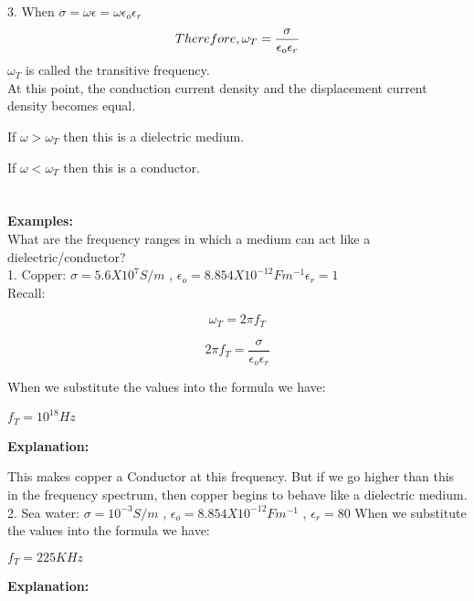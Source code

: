 	3. When $\sigma = \omega\epsilon = \omega\epsilon_{o}\epsilon_{r}$\\
	
	\begin{equation} Therefore,  \omega_{T} = \dfrac{\sigma}{\epsilon_{o}\epsilon_{r}}\\
	\end{equation}
	$\omega_{T}$ is called the transitive frequency.\\
	
	At this point, the conduction current density and the displacement current density becomes equal.
	
	If $\omega > \omega_{T}$ then this is a dielectric medium.
	
	If $\omega < \omega_{T}$ then this is a conductor.\\\\\\
	
	
	\textbf{Examples:}\\
	What are the frequency ranges in which a medium can act like a dielectric/conductor?\\
	
	1. Copper: $\sigma = 5.6 X 10^{7}S/m$ , $\epsilon_{o} = 8.854 X 10^{-12}Fm^{-1} \epsilon_{r} = 1$\\
	
	Recall:
	
	\begin{equation}
	\omega_{T} = 2\pi f_{T}
	\end{equation}
	
	\begin{equation}
	2\pi f_{T} = \dfrac{\sigma}{\epsilon_{o}\epsilon_{r}}
	\end{equation}
	
When we substitute the values into the formula we have:
	
	$f_{T} = 10^{18}Hz$
	
	\textbf{Explanation:}
	
	This makes copper a Conductor at this frequency. But if we go higher than this in the frequency spectrum, then copper begins to behave like a dielectric medium.\\
	
	2. Sea water: $\sigma = 10^{-3}S/m$ , $\epsilon_{o} = 8.854 X 10^{-12}Fm^{-1}$ , $\epsilon_{r} = 80$
When we substitute the values into the formula we have:

	$f_T=225KHz$
	
	\textbf{Explanation:}
	
